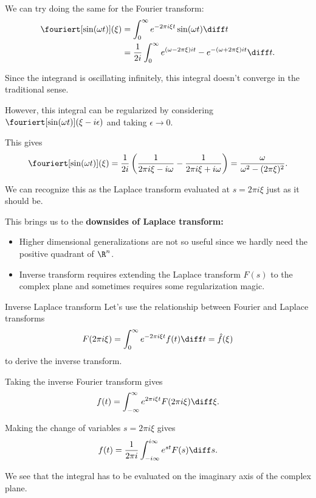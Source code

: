 \begin{frame}
	We can try doing the same for the Fourier transform:
	\[
	\begin{split}
	\fouriert[\sin(\omega t)](\xi) &= \int_{0}^{\infty} e^{-2\pi i \xi t} \sin(\omega t) \diff t \\
	&= \frac{1}{2i} \int_{0}^{\infty} e^{(\omega - 2\pi \xi )i t} - e^{-(\omega + 2\pi \xi )i t} \diff t.
	\end{split}
	\]
	
	\pause
	Since the integrand is oscillating infinitely, this integral doesn't converge in the traditional sense. 
	
	\pause
	However, this integral can be regularized by considering $ \fouriert[\sin(\omega t)](\xi - i\epsilon) $ and taking $ \epsilon \to 0 $.
	
	\pause
	This gives 
	\[ \fouriert[\sin(\omega t)](\xi) = \frac{1}{2i} \left( \frac{1}{2\pi i \xi - i \omega}
	- \frac{1}{2\pi i \xi + i \omega  }\right) = \frac{\omega}{\omega^2 - (2\pi \xi)^2}.
	 \]
	
	\pause
	We can recognize this as the Laplace transform evaluated at $ s = 2\pi i \xi $ just as it should be.
\end{frame}

\begin{frame}
	This brings us to the \textbf{downsides of Laplace transform:}
	\begin{itemize}[<+->]
		\item Higher dimensional generalizations are not so useful since we hardly need the positive quadrant of $ \R^n $.
		\item Inverse transform requires extending the Laplace transform $ F(s) $ to the complex plane and sometimes requires some regularization magic.
	\end{itemize}
\end{frame}

\begin{frame}{Inverse Laplace transform}
	Let's use the relationship between Fourier and Laplace transforms 
	\[ F(2\pi i \xi) = \int_{0}^{\infty} e^{-2\pi i \xi t} f(t) \diff t = \hat{f}(\xi) \]
	to derive the inverse transform.
	
	\pause
	Taking the inverse Fourier transform gives 
	\[ f(t) = \int_{-\infty}^{\infty} e^{2\pi i \xi t} F(2\pi i \xi) \diff \xi. \]
	
	\pause
	Making the change of variables $ s = 2\pi i \xi $ gives
	\[ 
	f(t) = \frac{1}{2\pi i} \int_{-i\infty}^{i\infty} e^{s t} F(s) \diff s.
	\]
	
	\pause
	We see that the integral has to be evaluated on the imaginary axis of the complex plane. 
\end{frame}

